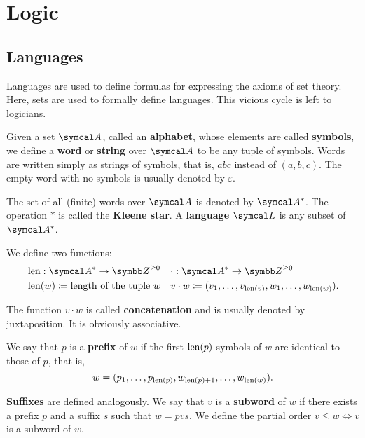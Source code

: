 \section{Logic}\label{sec:logic}
\subsection{Languages}\label{subsec:languages}

\begin{remark}\label{remark:language_definitions_using_sets}
  Languages are used to define formulas for expressing the axioms of set theory. Here, sets are used to formally define languages. This vicious cycle is left to logicians.
\end{remark}

\begin{definition}\label{def:language}
  Given a set \( \Cal{A} \), called an \textbf{alphabet}, whose elements are called \textbf{symbols}, we define a \textbf{word} or \textbf{string} over \( \Cal{A} \) to be any tuple of symbols. Words are written simply as strings of symbols, that is, \( abc \) instead of \( (a, b, c) \). The empty word with no symbols is usually denoted by \( \varepsilon \).

  The set of all (finite) words over \( \Cal{A} \) is denoted by \( \Cal{A}^{*} \). The operation \( * \) is called the \textbf{Kleene star}. A \textbf{language} \( \Cal{L} \) is any subset of \( \Cal{A}^{*} \).

  We define two functions:
  \begin{align*}
    &\Len: \Cal{A}^{*} \to \Z^{\geq 0}
    &&\cdot: \Cal{A}^{*} \to \Z^{\geq 0}
    \\
    &\Len(w) \coloneqq \text{length of the tuple } w
    &&v \cdot w \coloneqq (v_1, \ldots, v_{\Len(v)}, w_1, \ldots, w_{\Len(w)}).
  \end{align*}

  The function \( v \cdot w \) is called \textbf{concatenation} and is usually denoted by juxtaposition. It is obviously associative.

  We say that \( p \) is a \textbf{prefix} of \( w \) if the first \( \operatorname{len}(p) \) symbols of \( w \) are identical to those of \( p \), that is,
  \begin{equation*}
    w = (p_1, \ldots, p_{\operatorname{len}(p)}, w_{\operatorname{len}(p) + 1}, \ldots, w_{\operatorname{len}(w)}).
  \end{equation*}

  \textbf{Suffixes} are defined analogously. We say that \( v \) is a \textbf{subword} of \( w \) if there exists a prefix \( p \) and a suffix \( s \) such that \( w = pvs \). We define the partial order \( v \leq w \iff v \) is a subword of \( w \).


\end{definition}
